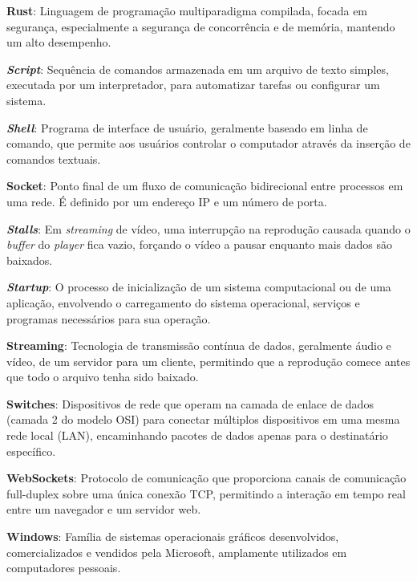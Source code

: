 {\textbf{Rust}: Linguagem de programação multiparadigma compilada, focada em segurança, especialmente a segurança de concorrência e de memória, mantendo um alto desempenho.

\textbf{\textit{Script}}: Sequência de comandos armazenada em um arquivo de texto simples, executada por um interpretador, para automatizar tarefas ou configurar um sistema.

\textbf{\textit{Shell}}: Programa de interface de usuário, geralmente baseado em linha de comando, que permite aos usuários controlar o computador através da inserção de comandos textuais.

\textbf{Socket}: Ponto final de um fluxo de comunicação bidirecional entre processos em uma rede. É definido por um endereço IP e um número de porta.

\textbf{\textit{Stalls}}: Em \textit{streaming} de vídeo, uma interrupção na reprodução causada quando o \textit{buffer} do \textit{player} fica vazio, forçando o vídeo a pausar enquanto mais dados são baixados.

\textbf{\textit{Startup}}: O processo de inicialização de um sistema computacional ou de uma aplicação, envolvendo o carregamento do sistema operacional, serviços e programas necessários para sua operação.

\textbf{Streaming}: Tecnologia de transmissão contínua de dados, geralmente áudio e vídeo, de um servidor para um cliente, permitindo que a reprodução comece antes que todo o arquivo tenha sido baixado.

\textbf{Switches}: Dispositivos de rede que operam na camada de enlace de dados (camada 2 do modelo OSI) para conectar múltiplos dispositivos em uma mesma rede local (LAN), encaminhando pacotes de dados apenas para o destinatário específico.

\textbf{WebSockets}: Protocolo de comunicação que proporciona canais de comunicação full-duplex sobre uma única conexão TCP, permitindo a interação em tempo real entre um navegador e um servidor web.

\textbf{Windows}: Família de sistemas operacionais gráficos desenvolvidos, comercializados e vendidos pela Microsoft, amplamente utilizados em computadores pessoais.
}


